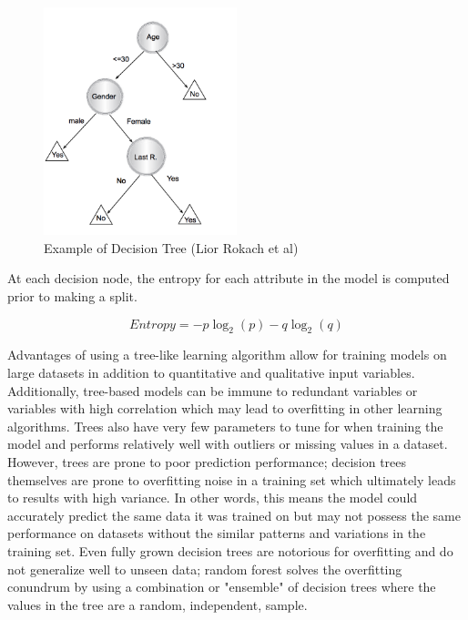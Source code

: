 \documentclass{llncs}
\begin{document}
\begin{figure}
\centering
\includegraphics[width=0.5\textwidth]{decisiontree.png}
\caption{Example of Decision Tree (Lior Rokach et al)}
\label{fig:tree}
\end{figure}


At each decision node, the entropy for each attribute in the model is computed prior to making a split. 


\begin{equation}
Entropy = -p\log_{2}(p) - q\log_{2}(q)
\end{equation}


\noindent 
Advantages of using a tree-like learning algorithm allow for training models on large datasets in addition to quantitative and qualitative input variables. Additionally, tree-based models can be immune to redundant variables or variables with high correlation which may lead to overfitting in other learning algorithms. Trees also have very few parameters to tune for when training the model and performs relatively well with outliers or missing values in a dataset. However, trees are prone to poor prediction performance; decision trees themselves are prone to overfitting noise in a training set which ultimately leads to results with high variance. In other words, this means the model could accurately predict the same data it was trained on but may not possess the same performance on datasets without the similar patterns and variations in the training set. Even fully grown decision trees are notorious for overfitting and do not generalize well to unseen data; random forest solves the overfitting conundrum by using a combination or "ensemble" of decision trees where the values in the tree are a random, independent, sample. 
\end{document}
